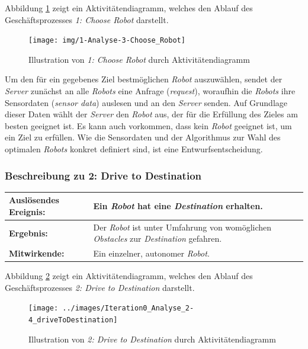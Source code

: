 			Abbildung \ref{fig:2-4-choose-robot-aktivitaetendiagramm} zeigt ein Aktivitätendiagramm, welches den Ablauf des Geschäftsprozesses \emph{1: Choose Robot} darstellt.
			\begin{figure}[H]
				\centering
				\texttt{[image: img/1-Analyse-3-Choose\_Robot]}
				\caption{Illustration von \emph{1: Choose Robot} durch Aktivitätendiagramm}
				\label{fig:2-4-choose-robot-aktivitaetendiagramm}
			\end{figure}

			Um den für ein gegebenes Ziel bestmöglichen \emph{Robot} auszuwählen, sendet
			der \emph{Server} zunächst an alle \emph{Robots} eine Anfrage (\emph{request}),
			woraufhin die \emph{Robots} ihre Sensordaten (\emph{sensor data}) auslesen und
			an den \emph{Server} senden. Auf Grundlage dieser Daten wählt der \emph{Server} den
			\emph{Robot} aus, der für die Erfüllung des Zieles am besten geeignet ist. Es kann auch vorkommen, dass kein \emph{Robot} geeignet ist, um ein Ziel zu erfüllen. Wie die Sensordaten und der Algorithmus zur Wahl des optimalen \emph{Robots} konkret definiert sind, ist eine Entwurfsentscheidung.

			\subsubsection*{Beschreibung zu 2: Drive to Destination}

			\begin{table}[H]
				\centering
				\begin{tabularx}{\textwidth}{|p{3cm}|X|}
				\hline
				\textbf{Auslösendes Ereignis:} & Ein \emph{Robot} hat eine \emph{Destination} erhalten.\\ \hline
				\textbf{Ergebnis:} & Der \emph{Robot} ist unter Umfahrung von womöglichen \emph{Obstacles} zur \emph{Destination} gefahren.\\ \hline
				\textbf{Mitwirkende:} &	Ein einzelner, autonomer \emph{Robot}. \\
				\hline
				\end{tabularx}
				\label{tab:2-4-drive-to-destination}
			\end{table}

			Abbildung \ref{fig:2-4-drive-to-destination-aktivitaetendiagramm} zeigt ein Aktivitätendiagramm, welches den Ablauf des Geschäftsprozesses \emph{2: Drive to Destination} darstellt.

			\begin{figure}[H]
				\centering
				\texttt{[image: ../images/Iteration0\_Analyse\_2-4\_driveToDestination]}
				\caption{Illustration von \emph{2: Drive to Destination} durch Aktivitätendiagramm}
				\label{fig:2-4-drive-to-destination-aktivitaetendiagramm}
			\end{figure}

